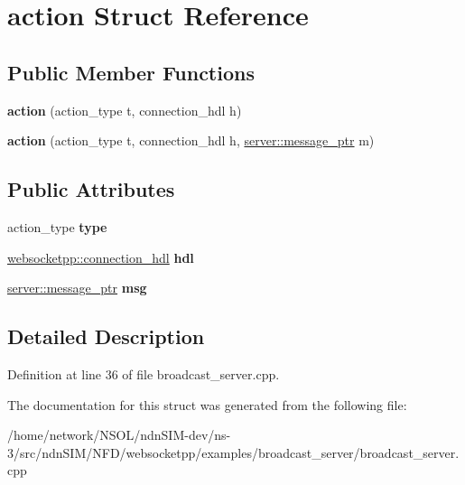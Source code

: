 \hypertarget{structaction}{}\section{action Struct Reference}
\label{structaction}
\subsection*{Public Member Functions}
\begin{DoxyCompactItemize}
\item 
{\bfseries action} (action\+\_\+type t, connection\+\_\+hdl h)\hypertarget{structaction_a0be087fbf9a58c69c490951f1b8ea505}{}\label{structaction_a0be087fbf9a58c69c490951f1b8ea505}

\item 
{\bfseries action} (action\+\_\+type t, connection\+\_\+hdl h, \hyperlink{classwebsocketpp_1_1endpoint_a585ecbbfd9689d4e4229e4c8378bd672}{server\+::message\+\_\+ptr} m)\hypertarget{structaction_ab8933d631653c7fbaa805af13f72b7fb}{}\label{structaction_ab8933d631653c7fbaa805af13f72b7fb}

\end{DoxyCompactItemize}
\subsection*{Public Attributes}
\begin{DoxyCompactItemize}
\item 
action\+\_\+type {\bfseries type}\hypertarget{structaction_aa154ad821e11c996d14c118e4cba0fb4}{}\label{structaction_aa154ad821e11c996d14c118e4cba0fb4}

\item 
\hyperlink{namespacewebsocketpp_a6b3d26a10ee7229b84b776786332631d}{websocketpp\+::connection\+\_\+hdl} {\bfseries hdl}\hypertarget{structaction_a77650a81e0754605034920b760c68054}{}\label{structaction_a77650a81e0754605034920b760c68054}

\item 
\hyperlink{classwebsocketpp_1_1endpoint_a585ecbbfd9689d4e4229e4c8378bd672}{server\+::message\+\_\+ptr} {\bfseries msg}\hypertarget{structaction_af08c66137b09d708c0e573273fde5ee9}{}\label{structaction_af08c66137b09d708c0e573273fde5ee9}

\end{DoxyCompactItemize}


\subsection{Detailed Description}


Definition at line 36 of file broadcast\+\_\+server.\+cpp.



The documentation for this struct was generated from the following file\+:\begin{DoxyCompactItemize}
\item 
/home/network/\+N\+S\+O\+L/ndn\+S\+I\+M-\/dev/ns-\/3/src/ndn\+S\+I\+M/\+N\+F\+D/websocketpp/examples/broadcast\+\_\+server/broadcast\+\_\+server.\+cpp\end{DoxyCompactItemize}
